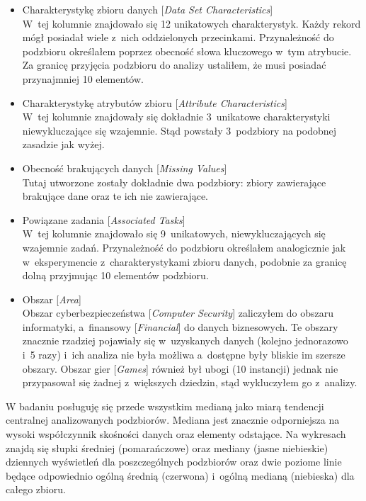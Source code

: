\begin{itemize}
  \item Charakterystykę zbioru danych [\emph{Data Set Characteristics}] \\
        W~tej kolumnie znajdowało się 12 unikatowych charakterystyk.
        Każdy rekord mógł posiadał wiele z~nich oddzielonych przecinkami.
        Przynależność do podzbioru określałem poprzez obecność słowa kluczowego w~tym atrybucie.
        Za granicę przyjęcia podzbioru do analizy ustaliłem, że musi posiadać przynajmniej 10 elementów.

  \item Charakterystykę atrybutów zbioru [\emph{Attribute Characteristics}] \\
        W~tej kolumnie znajdowały się dokładnie 3~unikatowe charakterystyki niewykluczające się wzajemnie.
        Stąd powstały 3~podzbiory na podobnej zasadzie jak wyżej.

  \item Obecność brakujących danych [\emph{Missing Values}] \\
        Tutaj utworzone zostały dokładnie dwa podzbiory: zbiory zawierające brakujące dane oraz te ich nie zawierające.

  \item Powiązane zadania [\emph{Associated Tasks}] \\
        W~tej kolumnie znajdowało się 9~unikatowych, niewykluczających się wzajemnie zadań.
        Przynależność do podzbioru określałem analogicznie jak w~eksperymencie z~charakterystykami zbioru danych, podobnie za granicę dolną przyjmując 10 elementów podzbioru.

  \item Obszar [\emph{Area}] \\
        Obszar cyberbezpieczeństwa [\emph{Computer Security}] zaliczyłem do obszaru informatyki, a~finansowy [\emph{Financial}] do danych biznesowych.
        Te obszary znacznie rzadziej pojawiały się w~uzyskanych danych (kolejno jednorazowo i~5 razy) i~ich analiza nie była możliwa a~dostępne były bliskie im szersze obszary.
        Obszar gier [\emph{Games}] również był ubogi (10 instancji) jednak nie przypasował się żadnej z~większych dziedzin, stąd wykluczyłem go z~analizy.

\end{itemize}

W badaniu posługuję się przede wszystkim medianą jako miarą tendencji centralnej analizowanych podzbiorów.
Mediana jest znacznie odporniejsza na wysoki współczynnik skośności danych oraz elementy odstające.
Na wykresach znajdą się słupki średniej (pomarańczowe) oraz mediany (jasne niebieskie) dziennych wyświetleń dla poszczególnych podzbiorów oraz dwie poziome linie będące odpowiednio ogólną średnią (czerwona) i~ogólną medianą (niebieska) dla całego zbioru.


